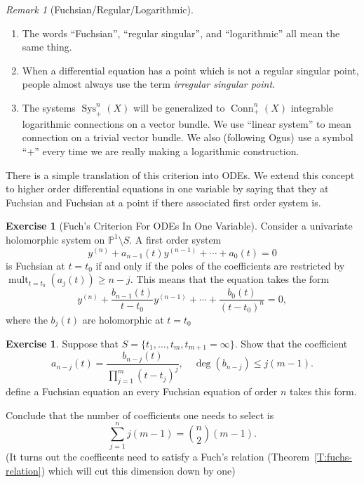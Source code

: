 \documentclass[12pt]{book}
\numberwithin{equation}{section}
\theoremstyle{definition}
\newtheorem{exercise}[theorem]{Exercise}
\theoremstyle{remark}
\newtheorem{remark}[theorem]{Remark}
\newcommand{\PP}{\mathbb{P}}
\newcommand{\mult}{\operatorname{mult}}
\newcommand{\Sys}{\operatorname{Sys}}
\newcommand{\Conn}{\operatorname{Conn}}
\begin{document}
\begin{remark}[Fuchsian/Regular/Logarithmic]
	\begin{enumerate}
		\item 	The words ``Fuchsian'', ``regular singular'', and ``logarithmic'' all mean the same thing.
		\item 	When a differential equation has a point which is not a regular singular point, people almost always use the term \emph{irregular singular point}.
		\item The systems $\Sys_+^n(X)$ will be generalized to $\Conn_+^n(X)$ integrable logarithmic connections on a vector bundle. 
		We use ``linear system'' to mean connection on a trivial vector bundle.
		We also (following Ogus) use a symbol ``$+$'' every time we are really making a logarithmic construction.
	\end{enumerate}
	

	
	
\end{remark}

There is a simple translation of this criterion into ODEs.
We extend this concept to higher order differential equations in one variable by saying that they at Fuchsian and Fuchsian at a point if there associated first order system is. 

\begin{exercise}[Fuch's Criterion For ODEs In One Variable]\label{E:fuchsian-odes}
	Consider a univariate holomorphic system on $\PP^1\setminus S$. 
	A first order system 
	 $$ y^{(n)} + a_{n-1}(t) y^{(n-1)} + \cdots + a_0(t)=0 $$
	is Fuchsian at $t=t_0$ if and only if  the poles of the coefficients are restricted by $\mult_{t=t_0}( a_j(t) ) \geq n-j $.
	This means that the equation takes the form
	 	 $$ y^{(n)} + \frac{b_{n-1}(t)}{t-t_0} y^{(n-1)} + \cdots + \frac{b_{0}(t)}{(t-t_0)^n} =0, $$
	where the $b_j(t)$ are holomorphic at $t=t_0$
\end{exercise}

\begin{exercise}\label{E:fuchsian-parameters}
	Suppose that $S = \lbrace t_1,\ldots,t_m, t_{m+1}=\infty\rbrace$.
	Show that the coefficient 
	 $$a_{n-j}(t)= \frac{b_{n-j}(t)}{\prod_{j=1}^m(t-t_j)^j}, \quad \deg(b_{n-j}) \leq j(m-1). $$
	define a Fuchsian equation an every Fuchsian equation of order $n$ takes this form.
	
	Conclude that the number of coefficients one needs to select is 
	 $$ \sum_{j=1}^{n} j(m-1) = {n \choose 2} (m-1). $$
	(It turns out the coefficents need to satisfy a Fuch's relation (Theorem~\ref{T:fuchs-relation}) which will cut this dimension down by one)
\end{exercise}
\end{document}
